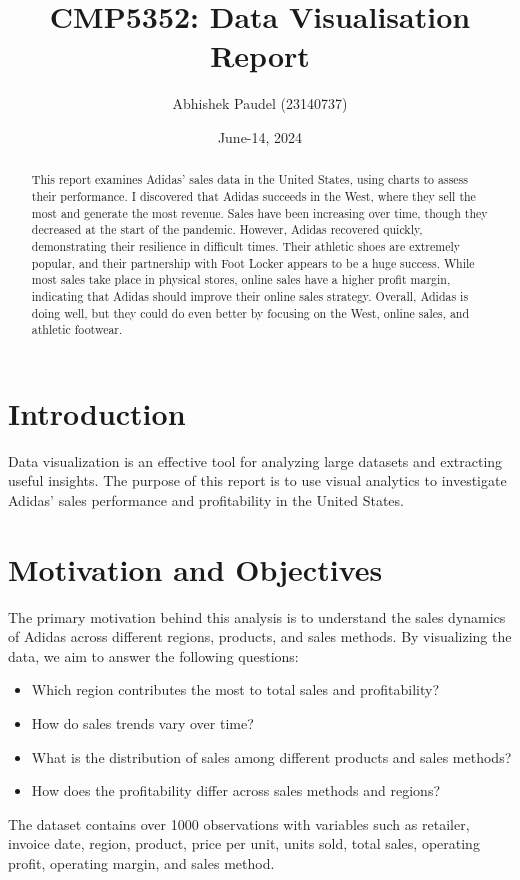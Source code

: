 \documentclass{article}\usepackage[]{graphicx}\usepackage[]{xcolor}
\title{\Huge CMP5352: Data Visualisation Report}
\author{\Large Abhishek Paudel (23140737)}
\date {June-14, 2024}
\begin{document}
\maketitle
\newpage
\tableofcontents
\newpage

\begin{abstract}
This report examines Adidas' sales data in the United States, using charts to assess their performance. I discovered that Adidas succeeds in the West, where they sell the most and generate the most revenue. Sales have been increasing over time, though they decreased at the start of the pandemic. However, Adidas recovered quickly, demonstrating their resilience in difficult times. Their athletic shoes are extremely popular, and their partnership with Foot Locker appears to be a huge success. While most sales take place in physical stores, online sales have a higher profit margin, indicating that Adidas should improve their online sales strategy. Overall, Adidas is doing well, but they could do even better by focusing on the West, online sales, and athletic footwear.

\end{abstract}

\newpage

\section{Introduction}

Data visualization is an effective tool for analyzing large datasets and extracting useful insights. The purpose of this report is to use visual analytics to investigate Adidas' sales performance and profitability in the United States.


\section{Motivation and Objectives}

The primary motivation behind this analysis is to understand the sales dynamics of Adidas across different regions, products, and sales methods. By visualizing the data, we aim to answer the following questions:
\begin{itemize}
    \item Which region contributes the most to total sales and profitability?
    \item How do sales trends vary over time?
    \item What is the distribution of sales among different products and sales methods?
    \item How does the profitability differ across sales methods and regions?
\end{itemize}
The dataset contains over 1000 observations with variables such as retailer, invoice date, region, product, price per unit, units sold, total sales, operating profit, operating margin, and sales method.
\end{document}
